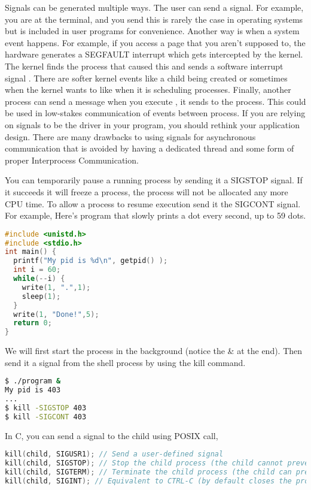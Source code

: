 Signals can be generated multiple ways. The user can send a signal. For example, you are at the terminal, and you send  this is rarely the case in operating systems but is included in user programs for convenience. Another way is when a system event happens. For example, if you access a page that you aren't supposed to, the hardware generates a SEGFAULT interrupt which gets intercepted by the kernel. The kernel finds the process that caused this and sends a software interrupt signal . There are softer kernel events like a child being created or sometimes when the kernel wants to like when it is scheduling processes. Finally, another process can send a message when you execute , it sends  to the process. This could be used in low-stakes communication of events between process. If you are relying on signals to be the driver in your program, you should rethink your application design. There are many drawbacks to using signals for asynchronous communication that is avoided by having a dedicated thread and some form of proper Interprocess Communication.

You can temporarily pause a running process by sending it a SIGSTOP signal. If it succeeds it will freeze a process, the process will not be allocated any more CPU time. To allow a process to resume execution send it the SIGCONT signal. For example, Here's program that slowly prints a dot every second, up to 59 dots.

\begin{lstlisting}[language=C]
#include <unistd.h>
#include <stdio.h>
int main() {
  printf("My pid is %d\n", getpid() );
  int i = 60;
  while(--i) {
    write(1, ".",1);
    sleep(1);
  }
  write(1, "Done!",5);
  return 0;
}
\end{lstlisting}

We will first start the process in the background (notice the \& at the end). Then send it a signal from the shell process by using the kill command.

\begin{lstlisting}[language=bash]
$ ./program &
My pid is 403
...
$ kill -SIGSTOP 403
$ kill -SIGCONT 403
\end{lstlisting}

In C, you can send a signal to the child using  POSIX call,

\begin{lstlisting}[language=C]
kill(child, SIGUSR1); // Send a user-defined signal
kill(child, SIGSTOP); // Stop the child process (the child cannot prevent this)
kill(child, SIGTERM); // Terminate the child process (the child can prevent this)
kill(child, SIGINT); // Equivalent to CTRL-C (by default closes the process)
\end{lstlisting}

